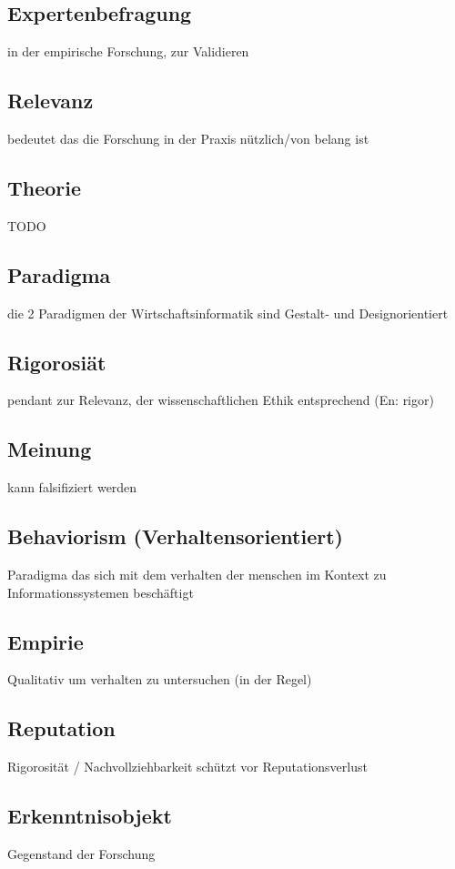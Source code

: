 \documentclass[DIV=calc, paper=a4, fontsize=11pt, twocolumn]{scrartcl}	 %
\begin{document}
\subsection*{Expertenbefragung}
in der empirische Forschung, zur Validieren

\subsection*{Relevanz}
bedeutet das die Forschung in der Praxis n\"utzlich/von belang ist

\subsection*{Theorie}
TODO

\subsection*{Paradigma}
die 2 Paradigmen der Wirtschaftsinformatik sind Gestalt- und Designorientiert

\subsection*{Rigorosiät}
pendant zur Relevanz, der wissenschaftlichen Ethik entsprechend (En: rigor)

\subsection*{Meinung}
kann falsifiziert werden

\subsection*{Behaviorism (Verhaltensorientiert)}
Paradigma das sich mit dem verhalten der menschen im Kontext zu Informationssystemen beschäftigt

\subsection*{Empirie}
Qualitativ um verhalten zu untersuchen (in der Regel)

\subsection*{Reputation}
Rigorosität / Nachvollziehbarkeit schützt vor Reputationsverlust

\subsection*{Erkenntnisobjekt}
Gegenstand der Forschung
\end{document}
